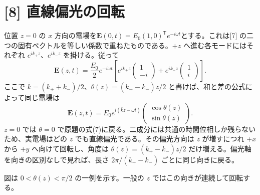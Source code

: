 \documentclass[11pt,a4paper]{article}
\begin{document}
\section*{[8] 直線偏光の回転}
位置 $z=0$ の $x$ 方向の電場を$\boldsymbol E(0,t)=E_0(1,0)^{\mathsf T}e^{-i\omega t}$とする。これは[7] の二つの固有ベクトルを等しい係数で重ねたものである。$+z$ へ進む各モードにはそれぞれ $e^{ik_+z}$、$e^{ik_-z}$ を掛ける。従って
\[
\boxed{\boldsymbol E(z,t)=\frac{E_0}{2}e^{-i\omega t}
\left[e^{ik_+z}\begin{pmatrix}1\\-i\end{pmatrix}
+e^{ik_-z}\begin{pmatrix}1\\i\end{pmatrix}\right].}
\]
ここで $\bar k=(k_++k_-)/2$、$\theta(z)=(k_+-k_-)z/2$ と書けば、和と差の公式によって同じ電場は
\[
\boxed{\boldsymbol E(z,t)=E_0e^{i(\bar k z-\omega t)}
\begin{pmatrix}\cos\theta(z)\\\sin\theta(z)\end{pmatrix}.}
\]
$z=0$ では $\theta=0$ で原題の式(7)に戻る。二成分には共通の時間位相しか残らないため、実電場はどの $z$ でも直線偏光である。その偏光方向は $z$ が増すにつれ $+x$ から $+y$ へ向けて回転し、角度は $\theta(z)=(k_+-k_-)z/2$ だけ増える。偏光軸を向きの区別なしで見れば、長さ $2\pi/(k_+-k_-)$ ごとに同じ向きに戻る。

\begin{center}
\end{center}
図は $0<\theta(z)<\pi/2$ の一例を示す。一般の $z$ ではこの向きが連続して回転する。
\end{document}

